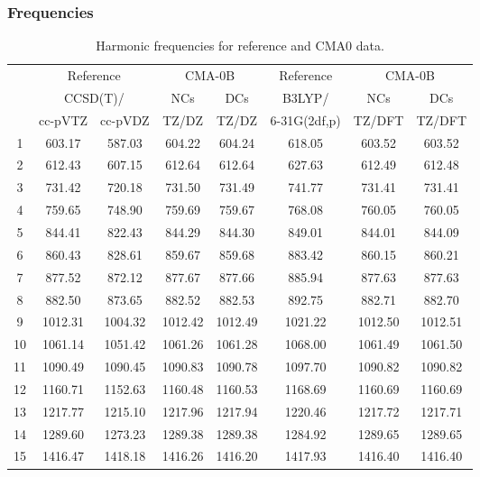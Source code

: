 \documentclass[10pt,oneside]{article}
\begin{document}
\subsubsection*{Frequencies}
\begin{table}[h!]
\centering
\caption{Harmonic frequencies for reference and CMA0 data.}
\begin{tabular}{cccccccc}
\toprule
{} & \multicolumn{2}{c}{Reference} & \multicolumn{2}{c}{CMA-0B} &    Reference & \multicolumn{2}{c}{CMA-0B} \\
{} & \multicolumn{2}{c}{CCSD(T)/} &     NCs &     DCs &       B3LYP/ &     NCs &     DCs \\
{} &   cc-pVTZ & cc-pVDZ &   TZ/DZ &   TZ/DZ & 6-31G(2df,p) &  TZ/DFT &  TZ/DFT \\
\midrule
1  &    603.17 &  587.03 &  604.22 &  604.24 &       618.05 &  603.52 &  603.52 \\
2  &    612.43 &  607.15 &  612.64 &  612.64 &       627.63 &  612.49 &  612.48 \\
3  &    731.42 &  720.18 &  731.50 &  731.49 &       741.77 &  731.41 &  731.41 \\
4  &    759.65 &  748.90 &  759.69 &  759.67 &       768.08 &  760.05 &  760.05 \\
5  &    844.41 &  822.43 &  844.29 &  844.30 &       849.01 &  844.01 &  844.09 \\
6  &    860.43 &  828.61 &  859.67 &  859.68 &       883.42 &  860.15 &  860.21 \\
7  &    877.52 &  872.12 &  877.67 &  877.66 &       885.94 &  877.63 &  877.63 \\
8  &    882.50 &  873.65 &  882.52 &  882.53 &       892.75 &  882.71 &  882.70 \\
9  &   1012.31 & 1004.32 & 1012.42 & 1012.49 &      1021.22 & 1012.50 & 1012.51 \\
10 &   1061.14 & 1051.42 & 1061.26 & 1061.28 &      1068.00 & 1061.49 & 1061.50 \\
11 &   1090.49 & 1090.45 & 1090.83 & 1090.78 &      1097.70 & 1090.82 & 1090.82 \\
12 &   1160.71 & 1152.63 & 1160.48 & 1160.53 &      1168.69 & 1160.69 & 1160.69 \\
13 &   1217.77 & 1215.10 & 1217.96 & 1217.94 &      1220.46 & 1217.72 & 1217.71 \\
14 &   1289.60 & 1273.23 & 1289.38 & 1289.38 &      1284.92 & 1289.65 & 1289.65 \\
15 &   1416.47 & 1418.18 & 1416.26 & 1416.20 &      1417.93 & 1416.40 & 1416.40 \\

\end{tabular}
\end{table}
\end{document}
